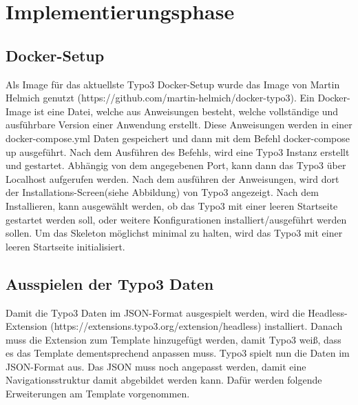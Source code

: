 \section{Implementierungsphase} 
\label{sec:Implementierungsphase}

\subsection{Docker-Setup}
\label{sec:Docker-Setup}

Als Image für das aktuellste Typo3 Docker-Setup wurde das Image von Martin Helmich genutzt (https://github.com/martin-helmich/docker-typo3). Ein Docker-Image ist eine Datei, welche aus Anweisungen besteht, welche vollständige und ausführbare Version einer Anwendung erstellt. Diese Anweisungen werden in einer docker-compose.yml Daten gespeichert und dann mit dem Befehl docker-compose up ausgeführt. Nach dem Ausführen des Befehls, wird eine Typo3 Instanz erstellt und gestartet. Abhängig von dem angegebenen Port, kann dann das Typo3 über Localhost aufgerufen werden. Nach dem ausführen der Anweisungen, wird dort der Installations-Screen(siehe Abbildung) von Typo3 angezeigt. Nach dem Installieren, kann ausgewählt werden, ob das Typo3 mit einer leeren Startseite gestartet werden soll, oder weitere Konfigurationen installiert/ausgeführt werden sollen. Um das Skeleton möglichst minimal zu halten, wird das Typo3 mit einer leeren Startseite initialisiert.

\subsection{Ausspielen der Typo3 Daten}
\label{sec:Ausspielen der Typo3 Daten}

Damit die Typo3 Daten im JSON-Format ausgespielt werden, wird die Headless-Extension \linebreak (https://extensions.typo3.org/extension/headless) installiert. Danach muss die Extension zum Template hinzugefügt werden, damit Typo3 weiß, dass es das Template dementsprechend anpassen muss. Typo3 spielt nun die Daten im JSON-Format aus. Das JSON muss noch angepasst werden, damit eine Navigationsstruktur damit abgebildet werden kann. Dafür werden folgende Erweiterungen am Template vorgenommen.


